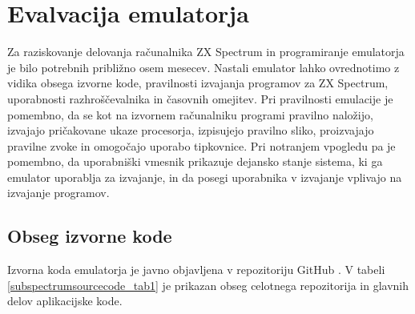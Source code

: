 \documentclass[a4paper, 12pt, openright]{book}
\begin{document}
    \chapter{Evalvacija emulatorja}
    \label{evalvacija}

    Za raziskovanje delovanja računalnika ZX Spectrum in programiranje
    emulatorja je bilo potrebnih približno osem mesecev. Nastali emulator lahko ovrednotimo
    z vidika obsega izvorne kode, pravilnosti izvajanja programov za ZX Spectrum,
    uporabnosti razhroščevalnika in časovnih omejitev. Pri pravilnosti emulacije
    je pomembno, da se kot na izvornem računalniku programi pravilno naložijo,
    izvajajo pričakovane ukaze procesorja, izpisujejo pravilno sliko,
    proizvajajo pravilne zvoke in omogočajo uporabo tipkovnice. Pri notranjem vpogledu
    pa je pomembno, da uporabniški vmesnik prikazuje dejansko stanje sistema, ki ga
    emulator uporablja za izvajanje, in da posegi uporabnika v izvajanje
    vplivajo na izvajanje programov.

    \section{Obseg izvorne kode}

    Izvorna koda emulatorja je javno objavljena v repozitoriju GitHub \cite{subspectrumgithub}.
    V tabeli \ref{subspectrumsourcecode_tab1} je prikazan obseg celotnega
    repozitorija in glavnih delov aplikacijske kode.
\end{document}
